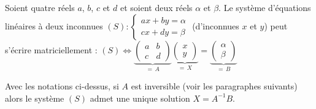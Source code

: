 	\begin{formula}
		Soient quatre réels $a$, $b$, $c$ et $d$ et soient deux réels $\alpha$ et $\beta$. Le système d'équations linéaires à deux inconnues $\displaystyle{(S) : \begin{cases}ax + by = \alpha \\ cx + dy = \beta\end{cases}}$ (d'inconnues $x$ et $y$) peut s'écrire matriciellement :
		\newpar
		$\displaystyle{(S) \iff \underbrace{\begin{pmatrix}a & b \\ c & d\end{pmatrix}}_{= \, A} \underbrace{\begin{pmatrix}x \\ y\end{pmatrix}}_{= \, X} = \underbrace{\begin{pmatrix}\alpha \\ \beta\end{pmatrix}}_{= \, B}}$
	\end{formula}
	
	\begin{formula}
		Avec les notations ci-dessus, si $A$ est inversible (voir les paragraphes suivants) alors le système $(S)$ admet une unique solution $X = A^{-1}B$.
	\end{formula}
	
